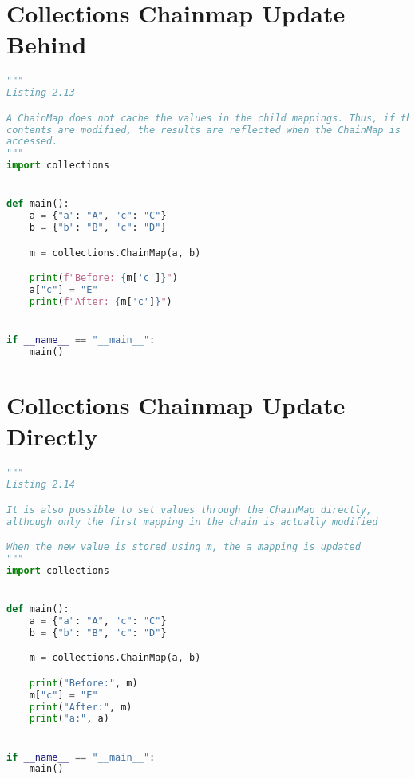 \documentclass[a4paper,landscape]{report}
\begin{document}
\section{Collections Chainmap Update Behind}
\begin{lstlisting}[language=Python]
"""
Listing 2.13

A ChainMap does not cache the values in the child mappings. Thus, if their
contents are modified, the results are reflected when the ChainMap is
accessed.
"""
import collections


def main():
    a = {"a": "A", "c": "C"}
    b = {"b": "B", "c": "D"}

    m = collections.ChainMap(a, b)

    print(f"Before: {m['c']}")
    a["c"] = "E"
    print(f"After: {m['c']}")


if __name__ == "__main__":
    main()

\end{lstlisting}
\section{Collections Chainmap Update Directly}
\begin{lstlisting}[language=Python]
"""
Listing 2.14

It is also possible to set values through the ChainMap directly,
although only the first mapping in the chain is actually modified

When the new value is stored using m, the a mapping is updated
"""
import collections


def main():
    a = {"a": "A", "c": "C"}
    b = {"b": "B", "c": "D"}

    m = collections.ChainMap(a, b)

    print("Before:", m)
    m["c"] = "E"
    print("After:", m)
    print("a:", a)


if __name__ == "__main__":
    main()

\end{lstlisting}
\end{document}
